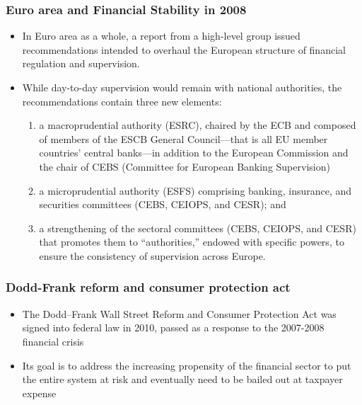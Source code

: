 \documentclass[11pt]{beamer}
\begin{document}
\begin{frame}
\frametitle{Euro area and Financial Stability in 2008}
\begin{itemize}
\item In Euro area as a whole, a report from a high-level group issued recommendations intended to overhaul the European structure of financial regulation and supervision.
\item While day-to-day supervision would remain with national authorities, the recommendations contain three new elements:
\begin{enumerate}
\item a macroprudential authority (ESRC), chaired by the ECB and composed of members of the ESCB General Council—that is all EU member countries’ central banks—in addition to the European Commission and the chair of CEBS (Committee for European Banking Supervision)
\item a microprudential authority (ESFS) comprising banking, insurance, and securities committees (CEBS, CEIOPS, and CESR); and
\item a strengthening of the sectoral committees (CEBS, CEIOPS, and CESR) that promotes them to “authorities,” endowed with specific powers, to ensure the consistency of supervision across Europe.
\end{enumerate}
\end{itemize}


\end{frame}



\begin{frame}
\begin{center}
\end{center}
\end{frame}


\begin{frame}
\frametitle{Dodd-Frank reform and consumer protection act}
\begin{itemize}
\item The Dodd–Frank Wall Street Reform and Consumer Protection Act was signed into federal law in 2010, passed as a response to the 2007-2008 financial crisis
\item Its goal is to address the increasing propensity of the financial sector to put the entire system at risk and eventually need to be bailed out at taxpayer expense
\end{itemize}
\end{frame}
\end{document}
